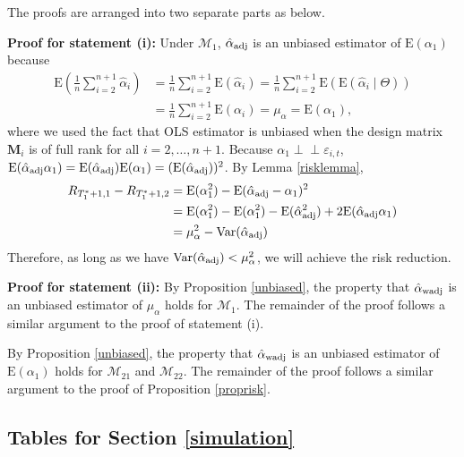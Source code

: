 \documentclass[11pt,3p,review,authoryear]{elsarticle}
\def\mbf#1{\mathbf{#1}} %
\newcommand{\indep}{\perp \!\!\! \perp } %
\def\mrm#1{\mathrm{#1}} %
\def\mc#1{\mathcal{#1}} %
\def\E#1{\mathrm{E}(#1)} %
\def\var#1{\mathrm{Var}(#1)} %
\theoremstyle{definition}
\newenvironment{proof-of-proposition}[1][{}]{\noindent{\bf
    Proof of Proposition {#1}}
  \hspace*{.5em}}{\qed\bigskip\\}
\begin{document}
\begin{proof-of-proposition}[\ref{proprisk}] The proofs are arranged into two separate parts as below.

 \textbf{Proof for statement (i):} Under $\mc{M}_1$, $\hat{\alpha}_{\rm adj}$ is an unbiased estimator of $\E{\alpha_1}$ because
\begin{align*}
   \mrm{E}\left( \frac{1}{n}\sum_{i=2}^{n+1} \hat{\alpha}_i\right)
   &= \frac{1}{n}\sum_{i=2}^{n+1}\E{\hat{\alpha}_i}
   = \frac{1}{n}\sum_{i=2}^{n+1}\E{\E{\hat{\alpha}_i\mid \Theta}}\\
   &=  \frac{1}{n}\sum_{i=2}^{n+1}\E{\alpha_i}
   = \mu_{\alpha}=\E{\alpha_1},
\end{align*}
  where we used the fact that OLS estimator is unbiased when the design matrix $\mbf{M}_i$ is of full rank for all $i = 2, \ldots, n+1$. Because $\alpha_1\indep \varepsilon_{i,t}$, $\E{\hat{\alpha}_{\rm adj}\alpha_1}=\E{\hat{\alpha}_{\rm adj}}\E{\alpha_1}=(\E{\hat{\alpha}_{\rm adj}})^2$. By Lemma \ref{risklemma}, 
\begin{align*}
  R_{T_1^*+1,1}-R_{T_1^*+1,2}
    &=\E{\alpha_1^2}-\E{\hat{\alpha}_{\rm adj}-\alpha_1}^2 \\
    &=\E{\alpha_1^2}-\E{\alpha_1^2}- \E{\hat{\alpha}_{\rm adj}^2}+2\E{\hat{\alpha}_{\rm adj}\alpha_1} \\
    &= \mu_{\alpha}^2 - \var{\hat{\alpha}_{\rm adj}} 
\end{align*}
  Therefore, as long as we have $\var{\hat{\alpha}_{\rm adj}}<\mu_{\alpha}^2$, we will achieve the risk reduction. 

 \textbf{Proof for statement (ii):} By Proposition \ref{unbiased}, the property that $\hat{\alpha}_{\rm wadj}$ is an unbiased estimator of $\mu_{\alpha}$ holds for $\mc{M}_{1}$. The remainder of the proof follows a similar argument to the proof of statement (i).
\end{proof-of-proposition}



\begin{proof-of-proposition}[\ref{propriskwadj2}]
  By Proposition \ref{unbiased}, the property that $\hat{\alpha}_{\rm wadj}$ is an unbiased estimator of $\E{\alpha_1}$ holds for $\mc{M}_{21}$ and $\mc{M}_{22}$. The remainder of the proof follows a similar argument to the proof of Proposition \ref{proprisk}.
\end{proof-of-proposition}




\subsection{Tables for Section \ref{simulation}}
\label{tablesappendix}
\end{document}
